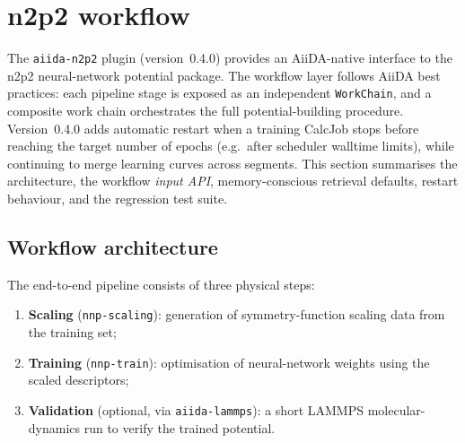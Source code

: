 %
%
%
%
%   

\section{n2p2 workflow}
\label{sec:n2p2-workflow}

The \texttt{aiida-n2p2} plugin (version~0.4.0) provides an AiiDA-native interface to the
n2p2 neural-network potential package.
The workflow layer follows AiiDA best practices: each pipeline stage
is exposed as an independent \texttt{WorkChain}, and a composite work chain orchestrates
the full potential-building procedure.
Version~0.4.0 adds automatic restart when a training CalcJob stops before reaching the
target number of epochs (e.g.\ after scheduler walltime limits), while continuing to
merge learning curves across segments.
This section summarises the architecture, the workflow \emph{input API}, memory-conscious
retrieval defaults, restart behaviour, and the regression test suite.

\subsection{Workflow architecture}

The end-to-end pipeline consists of three physical steps:
\begin{enumerate}
  \item \textbf{Scaling} (\texttt{nnp-scaling}): generation of symmetry-function
        scaling data from the training set;
  \item \textbf{Training} (\texttt{nnp-train}): optimisation of neural-network
        weights using the scaled descriptors;
  \item \textbf{Validation} (optional, via \texttt{aiida-lammps}): a short LAMMPS
        molecular-dynamics run to verify the trained potential.
\end{enumerate}

